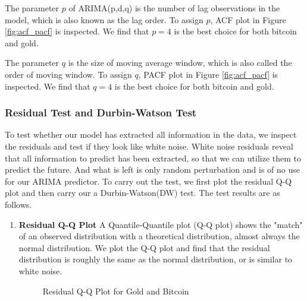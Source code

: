 \documentclass[12pt,a4paper]{article}
\newcommand{\Predictor}{ARIMA }
\begin{document}
\begin{spacing}{1.2}
The parameter $p$ of ARIMA(p,d,q) is the number of lag observations in the model, which is also known as the lag order. To assign $p$, ACF plot in Figure \ref{fig:acf_pacf} is inspected. We find that $p=4$ is the best choice for both bitcoin and gold.

The parameter $q$ is the size of moving average window, which is also called the order of moving window. To assign $q$, PACF plot in Figure \ref{fig:acf_pacf} is inspected. We find that $q=4$ is the best choice for both bitcoin and gold.


\subsubsection{Residual Test and Durbin-Watson Test}
To test whether our model has extracted all information in the data, we inspect the residuals and test if they look like white noise. White noise residuals reveal that all information to predict has been extracted, so that we can utilize them to predict the future. And what is left is only random perturbation and is of no use for our \Predictor predictor. To carry out the test, we first plot the residual Q-Q plot and then carry our a Durbin-Watson(DW) test. The test results are as follows.

\begin{enumerate}
	\item \textbf{Residual Q-Q Plot}
	A Quantile-Quantile plot (Q-Q plot) shows the "match" of an observed distribution with a theoretical distribution, almost always the normal distribution. We plot the Q-Q plot and find that the residual distribution is roughly the same as the normal distribution, or is similar to white noise.
	
	\begin{figure}
		\begin{center}
		\end{center}
			\caption{Residual Q-Q Plot for Gold and Bitcoin}
		\label{fig:qq_plot}
	\end{figure}


\end{enumerate}
\end{spacing}
\end{document}
